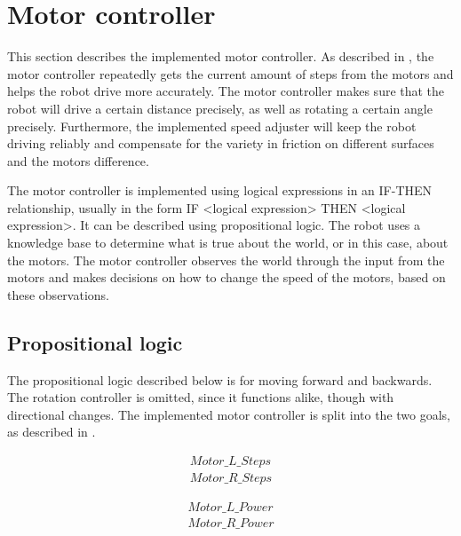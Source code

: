 \section{Motor controller} \label{sec:motor-controller-imp} 
This section describes the implemented motor controller. As described in , the motor controller repeatedly gets the current amount of steps from the motors and helps the robot drive more accurately. The motor controller makes sure that the robot will drive a certain distance precisely, as well as rotating a certain angle precisely. Furthermore, the implemented speed adjuster will keep the robot driving reliably and compensate for the variety in friction on different surfaces and the motors difference.

The motor controller is implemented using logical expressions in an IF-THEN relationship, usually in the form IF <logical expression> THEN <logical expression>. It can be described using propositional logic. The robot uses a knowledge base to determine what is true about the world, or in this case, about the motors. The motor controller observes the world through the input from the motors and makes decisions on how to change the speed of the motors, based on these observations.


\subsection{Propositional logic}

The propositional logic described below is for moving forward and backwards. The rotation controller is omitted, since it functions alike, though with directional changes. The implemented motor controller is split into the two goals, as described in . 


\begin{equation} \label{eq:motorsteps}
\begin{split}
Motor\_L\_Steps \\
Motor\_R\_Steps
\end{split}
\end{equation}

\begin{equation} \label{eq:motorpower}
\begin{split}
Motor\_L\_Power \\
Motor\_R\_Power
\end{split}
\end{equation}

